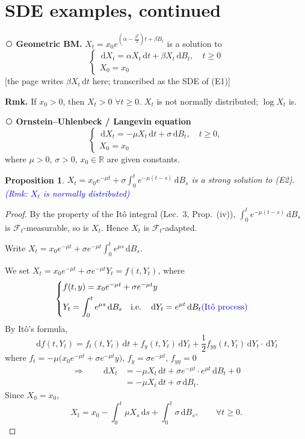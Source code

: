 \documentclass[11pt]{article}
\newcommand{\R}{\mathbb{R}}
\newcommand{\F}{\mathcal{F}}
\newcommand{\dd}{\,\mathrm{d}}
\newcommand{\cnum}[1]{\textcircled{\raisebox{-0.6pt}{\scriptsize #1}}} %
\newcommand{\ann}[1]{\textcolor{blue}{#1}}
\newcommand{\ednote}[1]{\textcolor{red!70!black}{\footnotesize[#1]}}
\theoremstyle{definition}
\theoremstyle{plain}
\newtheorem{proposition}{Proposition}[section]
\begin{document}
\section{SDE examples, continued}

\noindent\cnum{1} \textbf{Geometric BM.}
$X_t=x_0e^{(\alpha-\frac{\beta^2}{2})t+\beta B_t}$ is a solution to
\[
  \begin{cases}
    \dd X_t=\alpha X_t\dd t+\beta X_t\dd B_t, \quad t\ge0\\[2pt]
    X_0=x_0
  \end{cases}
\]
\ednote{the page writes $\beta X_t\dd t$ here; transcribed as the SDE of (E1)}

\medskip
\noindent\textbf{Rmk.} If $x_0>0$, then $X_t>0$ $\forall t\ge0$. $X_t$ is not normally
distributed; $\log X_t$ is.

\medskip
\noindent\cnum{2} \textbf{Ornstein--Uhlenbeck / Langevin equation}
\[
  \begin{cases}
    \dd X_t=-\mu X_t\dd t+\sigma\dd B_t, \quad t\ge0,\\[2pt]
    X_0=x_0
  \end{cases}
  \tag*{(E2)}
\]
where $\mu>0$, $\sigma>0$, $x_0\in\R$ are given constants.

\begin{proposition}
$X_t=x_0e^{-\mu t}+\sigma\int_0^te^{-\mu(t-s)}\dd B_s$ is a strong solution to (E2).
\ann{(Rmk: $X_t$ is normally distributed)}
\end{proposition}

\begin{proof}
By the property of the It\^o integral (Lec.~3, Prop.\ (iv)),
$\int_0^te^{-\mu(t-s)}\dd B_s$ is $\F_t$-measurable, so is $X_t$. Hence $X_t$ is
$\F_t$-adapted.

\noindent Write $X_t=x_0e^{-\mu t}+\sigma e^{-\mu t}\displaystyle\int_0^te^{\mu s}\dd B_s$.

\noindent We set $X_t=x_0e^{-\mu t}+\sigma e^{-\mu t}Y_t=f(t,Y_t)$, where
\[
  \begin{cases}
    f(t,y)=x_0e^{-\mu t}+\sigma e^{-\mu t}y\\[4pt]
    Y_t=\displaystyle\int_0^te^{\mu s}\dd B_s \quad\text{i.e.}\quad
      \dd Y_t=e^{\mu t}\dd B_t \ann{\text{(It\^o process)}}
  \end{cases}
\]
By It\^o's formula,
\[
  \dd f(t,Y_t)
  =f_t(t,Y_t)\dd t+f_y(t,Y_t)\dd Y_t+\frac12f_{yy}(t,Y_t)\dd Y_t\cdot\dd Y_t
\]
where $f_t=-\mu\bigl(x_0e^{-\mu t}+\sigma e^{-\mu t}y\bigr)$, \;
$f_y=\sigma e^{-\mu t}$, \; $f_{yy}=0$
\begin{align*}
  \Longrightarrow\qquad
  \dd X_t
    &=-\mu X_t\dd t+\sigma e^{-\mu t}\cdot e^{\mu t}\dd B_t+0\\
    &=-\mu X_t\dd t+\sigma\dd B_t .
\end{align*}
Since $X_0=x_0$,
\[
  X_t=x_0-\int_0^t\mu X_s\dd s+\int_0^t\sigma\dd B_s ,\qquad \forall t\ge0 .
\]
\end{proof}
\end{document}
